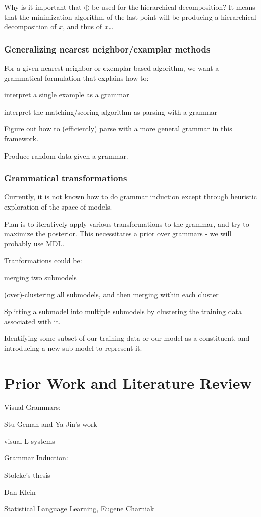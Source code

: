 \documentclass{article}
\begin{document}
Why is it important that $\oplus$ be used for the hierarchical
decomposition? It means that the minimization algorithm of the last
point will be producing a hierarchical decomposition of $x$, and thus
of $x_*$.

\subsubsection{Generalizing nearest neighbor/examplar methods}
For a given nearest-neighbor or exemplar-based algorithm, we want a
grammatical formulation that explains how to: 

\bitem
\item interpret a single example as a grammar
\item interpret the matching/scoring algorithm as parsing with a grammar
\item Figure out how to (efficiently) parse with a more general grammar in this framework.
\item Produce random data given a grammar.
\eitem


\subsubsection{Grammatical transformations}

Currently, it is not known how to do grammar induction except through
heuristic exploration of the space of models.

Plan is to iteratively apply various transformations to the grammar,
and try to maximize the posterior. This necessitates a prior over
grammars - we will probably use MDL.

Tranformations could be:
\bitem
\item merging two submodels
\item (over)-clustering all submodels, and then merging within each cluster
\item Splitting a submodel into multiple submodels by clustering the
  training data associated with it.
\item Identifying some subset of our training data or our model as a
  constituent, and introducing a new sub-model to represent it.
\eitem

























\section{Prior Work and Literature Review}
\bitem
\item Visual Grammars:
\bitem
\item Stu Geman and Ya Jin's work
\item visual L-systems
\eitem
\item Grammar Induction:
\bitem
\item Stolcke's thesis
\item Dan Klein 
\item Statistical Language Learning, Eugene Charniak
\eitem
\eitem
\end{document}
